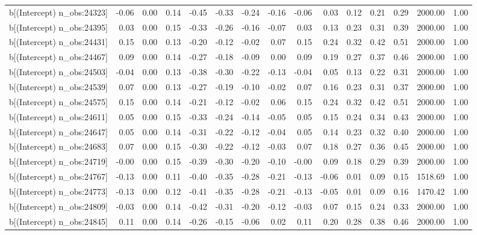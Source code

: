 \begin{table}[ht]
\begin{tabular}{rrrrrrrrrrrrrrr}
  b[(Intercept) n\_obs:24323] & -0.06 & 0.00 & 0.14 & -0.45 & -0.33 & -0.24 & -0.16 & -0.06 & 0.03 & 0.12 & 0.21 & 0.29 & 2000.00 & 1.00 \\ 
  b[(Intercept) n\_obs:24395] & 0.03 & 0.00 & 0.15 & -0.33 & -0.26 & -0.16 & -0.07 & 0.03 & 0.13 & 0.23 & 0.31 & 0.39 & 2000.00 & 1.00 \\ 
  b[(Intercept) n\_obs:24431] & 0.15 & 0.00 & 0.13 & -0.20 & -0.12 & -0.02 & 0.07 & 0.15 & 0.24 & 0.32 & 0.42 & 0.51 & 2000.00 & 1.00 \\ 
  b[(Intercept) n\_obs:24467] & 0.09 & 0.00 & 0.14 & -0.27 & -0.18 & -0.09 & 0.00 & 0.09 & 0.19 & 0.27 & 0.37 & 0.46 & 2000.00 & 1.00 \\ 
  b[(Intercept) n\_obs:24503] & -0.04 & 0.00 & 0.13 & -0.38 & -0.30 & -0.22 & -0.13 & -0.04 & 0.05 & 0.13 & 0.22 & 0.31 & 2000.00 & 1.00 \\ 
  b[(Intercept) n\_obs:24539] & 0.07 & 0.00 & 0.13 & -0.27 & -0.19 & -0.10 & -0.02 & 0.07 & 0.16 & 0.23 & 0.31 & 0.37 & 2000.00 & 1.00 \\ 
  b[(Intercept) n\_obs:24575] & 0.15 & 0.00 & 0.14 & -0.21 & -0.12 & -0.02 & 0.06 & 0.15 & 0.24 & 0.32 & 0.42 & 0.51 & 2000.00 & 1.00 \\ 
  b[(Intercept) n\_obs:24611] & 0.05 & 0.00 & 0.15 & -0.33 & -0.24 & -0.14 & -0.05 & 0.05 & 0.15 & 0.24 & 0.34 & 0.43 & 2000.00 & 1.00 \\ 
  b[(Intercept) n\_obs:24647] & 0.05 & 0.00 & 0.14 & -0.31 & -0.22 & -0.12 & -0.04 & 0.05 & 0.14 & 0.23 & 0.32 & 0.40 & 2000.00 & 1.00 \\ 
  b[(Intercept) n\_obs:24683] & 0.07 & 0.00 & 0.15 & -0.30 & -0.22 & -0.12 & -0.03 & 0.07 & 0.18 & 0.27 & 0.36 & 0.45 & 2000.00 & 1.00 \\ 
  b[(Intercept) n\_obs:24719] & -0.00 & 0.00 & 0.15 & -0.39 & -0.30 & -0.20 & -0.10 & -0.00 & 0.09 & 0.18 & 0.29 & 0.39 & 2000.00 & 1.00 \\ 
  b[(Intercept) n\_obs:24767] & -0.13 & 0.00 & 0.11 & -0.40 & -0.35 & -0.28 & -0.21 & -0.13 & -0.06 & 0.01 & 0.09 & 0.15 & 1518.69 & 1.00 \\ 
  b[(Intercept) n\_obs:24773] & -0.13 & 0.00 & 0.12 & -0.41 & -0.35 & -0.28 & -0.21 & -0.13 & -0.05 & 0.01 & 0.09 & 0.16 & 1470.42 & 1.00 \\ 
  b[(Intercept) n\_obs:24809] & -0.03 & 0.00 & 0.14 & -0.42 & -0.31 & -0.20 & -0.12 & -0.03 & 0.07 & 0.15 & 0.24 & 0.33 & 2000.00 & 1.00 \\ 
  b[(Intercept) n\_obs:24845] & 0.11 & 0.00 & 0.14 & -0.26 & -0.15 & -0.06 & 0.02 & 0.11 & 0.20 & 0.28 & 0.38 & 0.46 & 2000.00 & 1.00 \\ 

\end{tabular}
\end{table}
